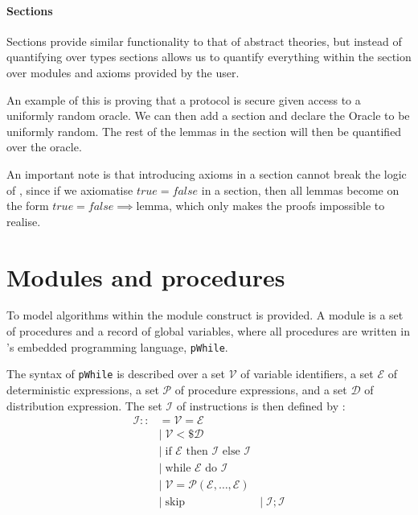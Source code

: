 \paragraph{Sections}
Sections provide similar functionality to that of abstract theories, but instead of quantifying over
types sections allows us to quantify everything within the section over modules and
axioms provided by the user.

An example of this is proving that a protocol is secure given access to a
uniformly random oracle.
We can then add a section and declare the
Oracle to be uniformly random. The rest of the lemmas in the section will then
be quantified over the oracle.

An important note is that introducing axioms in a section cannot break the logic
of \easycrypt, since if we axiomatise $true = false$ in a section, then all
lemmas become on the form $true = false \implies \text{lemma}$, which only
makes the proofs impossible to realise.

\section{Modules and procedures}
\label{sec:ec_modules}
To model algorithms within \easycrypt the module construct is provided.
A module is a set of procedures and a record of global variables, where all
procedures are written in \easycrypt's embedded programming language, \texttt{pWhile}.

The syntax of \texttt{pWhile} is described over a set $\mathcal{V}$ of variable
identifiers, a set $\mathcal{E}$ of deterministic expressions, a set
$\mathcal{P}$ of procedure expressions, and a set $\mathcal{D}$ of distribution
expression.
The set $\mathcal{I}$ of instructions is then defined
by \cite{zkcrypt}:
\begin{align*}
  \mathcal{I} ::&= \mathcal{V} = \mathcal{E} \\
              &|\; \mathcal{V} <\$ \mathcal{D} \\
              &|\; \text{if } \mathcal{E} \text{ then } \mathcal{I} \text{ else } \mathcal{I} \\
              &|\; \text{while } \mathcal{E} \text{ do } \mathcal{I} \\
              &|\; \mathcal{V} = \mathcal{P}(\mathcal{E}, \dots, \mathcal{E}) \\
              &|\; \text{skip}
              &|\; \mathcal{I}; \mathcal{I}
\end{align*}

